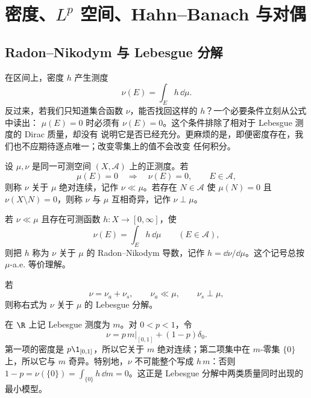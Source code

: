 \section{密度、\texorpdfstring{$L^p$}{Lp} 空间、Hahn--Banach 与对偶}\label{sec:03-03}

\subsection{Radon--Nikodym 与 Lebesgue 分解}\label{subsec:3-3-1}

在区间上，密度 $h$ 产生测度
\[
  \nu(E)=\int_E h\,\dd\mu .
\]
反过来，若我们只知道集合函数 $\nu$，能否找回这样的 $h$？一个必要条件立刻从公式中读出：
$\mu(E)=0$ 时必须有 $\nu(E)=0$。这个条件排除了相对于 Lebesgue 测度的 Dirac 质量，却没有
说明它是否已经充分。更麻烦的是，即便密度存在，我们也不应期待逐点唯一；改变零集上的值不会改变
任何积分。

\begin{definition}[绝对连续与奇异]\label{def:3-3-1-1}
设 $\mu,\nu$ 是同一可测空间 $(X,\mathcal A)$ 上的正测度。若
\[
  \mu(E)=0\quad\Longrightarrow\quad \nu(E)=0,
  \qquad E\in\mathcal A,
\]
则称 $\nu$ 关于 $\mu$ 绝对连续，记作 $\nu\ll\mu$。若存在 $N\in\mathcal A$ 使
$\mu(N)=0$ 且 $\nu(X\setminus N)=0$，则称 $\nu$ 与 $\mu$ 互相奇异，记作 $\nu\perp\mu$。
\end{definition}

\begin{definition}\label{def:3-3-1-2}
若 $\nu\ll\mu$ 且存在可测函数 $h:X\to[0,\infty]$，使
\[
  \nu(E)=\int_Eh\,\dd\mu\qquad(E\in\mathcal A),
\]
则把 $h$ 称为 $\nu$ 关于 $\mu$ 的 Radon--Nikodym 导数，记作
$h=\dd\nu/\dd\mu$。这个记号总按 $\mu$-a.e. 等价理解。
\end{definition}

\begin{definition}[Lebesgue 分解]\label{def:3-3-1-3}
若
\[
  \nu=\nu_a+\nu_s,\qquad \nu_a\ll\mu,\qquad \nu_s\perp\mu,
\]
则称右式为 $\nu$ 关于 $\mu$ 的 Lebesgue 分解。
\end{definition}

\begin{example}[密度与原子]\label{ex:3-3-1-1}
在 $\R$ 上记 Lebesgue 测度为 $m$。对 $0<p<1$，令
\[
  \nu=p\,m|_{[0,1]}+(1-p)\delta_0.
\]
第一项的密度是 $p\1_{[0,1]}$，所以它关于 $m$ 绝对连续；第二项集中在 $m$-零集
$\{0\}$ 上，所以它与 $m$ 奇异。特别地，$\nu$ 不可能整个写成 $h\,m$：否则
$1-p=\nu(\{0\})=\int_{\{0\}}h\,\dd m=0$。这正是 Lebesgue 分解中两类质量同时出现的
最小模型。
\end{example}


